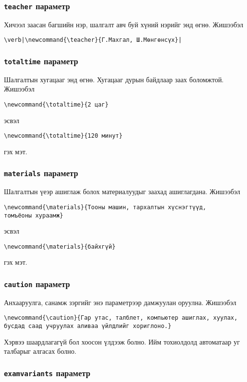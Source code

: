 \documentclass[10pt]{article}
\theoremstyle{definition}
\begin{document}
\subsubsection{\texttt{teacher} параметр}

Хичээл заасан багшийн нэр, шалгалт авч буй хүний нэрийг энд өгнө. Жишээбэл
\begin{verbatim}
\verb|\newcommand{\teacher}{Г.Махгал, Ш.Мөнгөнсүх}|
\end{verbatim}

\subsubsection{\texttt{totaltime} параметр}

Шалгалтын хугацааг энд өгнө. Хугацааг дурын байдлаар заах боломжтой. Жишээбэл
\begin{verbatim}
\newcommand{\totaltime}{2 цаг}
\end{verbatim}
эсвэл
\begin{verbatim}
\newcommand{\totaltime}{120 минут}
\end{verbatim}
гэх мэт.

\subsubsection{\texttt{materials} параметр}

Шалгалтын үеэр ашиглаж болох материалуудыг заахад ашиглагдана. Жишээбэл \begin{verbatim}
\newcommand{\materials}{Тооны машин, тархалтын хүснэгтүүд, 
томъёоны хураамж}
\end{verbatim}
эсвэл
\begin{verbatim}
\newcommand{\materials}{байхгүй}
\end{verbatim}
гэх мэт.

\subsubsection{\texttt{caution} параметр}

Анхааруулга, санамж зэргийг энэ параметрээр дамжуулан оруулна. Жишээбэл 
\begin{verbatim}
\newcommand{\caution}{Гар утас, талблет, компьютер ашиглах, хуулах, 
бусдад саад учруулах аливаа үйлдлийг хориглоно.}
\end{verbatim}
Хэрвээ шаардлагагүй бол хоосон үлдээж болно. Ийм тохиолдолд автоматаар уг талбарыг алгасах болно.

\subsubsection{\texttt{examvariants} параметр}
\end{document}
